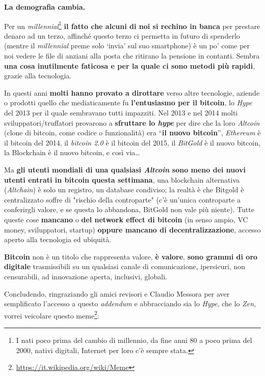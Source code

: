 \documentclass[a4paper,12pt,italian]{article}
\begin{document}
\textbf{La demografia cambia.}

\bigskip

Per un \emph{millennial}\footnote{I nati poco prima del cambio di millennio, da fine anni 80 a poco prima del 2000, nativi digitali,
Internet per loro c'è sempre stata.} \textbf{il fatto che alcuni di noi si rechino in banca} per prestare denaro
ad un terzo, affinché questo terzo ci permetta in futuro di spenderlo (mentre il \emph{millennial} preme solo ‘invia’ sul suo
smartphone) è un po’ come per noi vedere le file di anziani alla posta che ritirano la pensione in contanti. Sembra
\textbf{una cosa inutilmente faticosa e per la quale ci sono metodi più rapidi}, grazie alla
tecnologia.

\smallskip

In questi anni \textbf{molti hanno provato a dirottare} verso altre tecnologie,
aziende o prodotti quello che mediaticamente fu \textbf{l’entusiasmo per il bitcoin}, lo \emph{Hype} del 2013 per il
quale sembravano tutti impazziti. Nel 2013 e nel 2014 molti sviluppatori/truffatori provarono a \textbf{sfruttare
lo \emph{hype}} per dire che la loro \emph{Altcoin} (clone di bitcoin, come codice o funzionalità) era “\textbf{il
nuovo bitcoin}”, \emph{Ethereum} è il bitcoin del 2014, il \emph{bitcoin 2.0} è il bitcoin del 2015, il \emph{BitGold} è il nuovo
bitcoin, la Blockchain è il nuovo bitcoin, e così via\ldots

Ma \textbf{gli utenti mondiali di una qualsiasi \emph{Altcoin} sono meno dei nuovi utenti entrati in bitcoin
questa settimana}, una blockchain alternativa (\emph{Altchain}) è solo un registro, un database condiviso; la
realtà è che Bitgold è centralizzato soffre di "rischio della controparte" (c'è un'unica controparte a conferirgli valore, e se questa lo abbandona, BitGold non vale più niente). Tutte queste cose \textbf{mancano} o \textbf{del network effect di
bitcoin} (in senso ampio, VC money, sviluppatori, startup) \textbf{oppure mancano di
decentralizzazione}, accesso aperto alla tecnologia ed ubiquità.


\bigskip


\textbf{Bitcoin} non è un titolo che rappresenta valore, \textbf{è valore},
\textbf{sono grammi di oro digitale} trasmissibili su un qualsiasi canale di comunicazione,
ipersicuri, non censurabili, ad innovazione aperta, inclusivi, globali.


\bigskip

Concludendo, ringraziando gli amici revisori e Claudio Messora per aver semplificato l'accesso a questo \emph{addendum} e abbracciando sia lo \emph{Hype}, che lo \emph{Zen},
vorrei veicolare questo meme\footnote{\url{https://it.wikipedia.org/wiki/Meme}}: 
\bigskip
\end{document}
